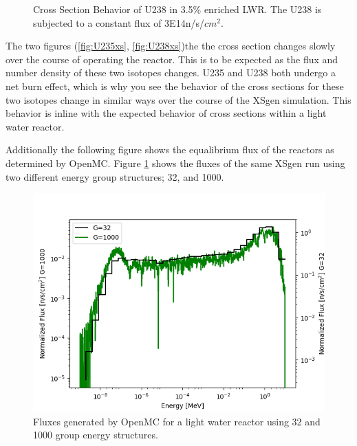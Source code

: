 \documentclass{article}
\begin{document}
\begin{figure}
\caption{Cross Section Behavior of U238 in 3.5\% enriched LWR. The U238 is subjected to a constant flux of 3E14n/s/$cm^2$.}
\end{figure}

The two figures (\ref{fig:U235xs}, \ref{fig:U238xs})the the cross section changes slowly over the course of operating the reactor. This is to be expected as the flux and number density of these two isotopes changes. U235 and U238 both undergo a net burn effect, which is why you see the behavior of the cross sections for these two isotopes change in similar ways over the course of the XSgen simulation. This behavior is inline with the expected behavior of cross sections within a light water reactor. 

Additionally the following figure shows the equalibrium flux of the reactors as determined by OpenMC. 
Figure \ref{fig:32g} shows the fluxes of the same XSgen run using two different energy group structures; 32, and 1000.  

\begin{figure}[h]
  \center
  \includegraphics[scale=0.7]{fluxes.png}
  \caption{Fluxes generated by OpenMC for a light water reactor using 32 and 1000 group energy structures.}
  \label{fig:32g}
\end{figure}
\end{document}
